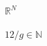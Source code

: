 \documentclass{article}
\begin{document}
$ \mathbb{R}^N $
\pagebreak

$ 12/g \in \mathbb{N} $
\pagebreak
\end{document}
